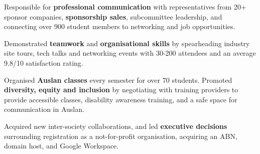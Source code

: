 \begin{zitemize}
\item Responsible for \textbf{professional communication} with representatives from 20+ sponsor companies, \textbf{sponsorship sales}, subcommittee {leadership}, and connecting over 900 student members to networking and job opportunities.
\item Demonstrated \textbf{teamwork} and \textbf{organisational skills} by spearheading industry site tours, tech talks and networking events with 30-200 attendees and an average 9.8/10 satisfaction rating. 
\end{zitemize}
\vspace{0.5em}

\begin{zitemize}
\item Organised \textbf{Auslan classes} every semester for over 70 students. Promoted \textbf{diversity, equity and inclusion} by negotiating with training providers to provide accessible classes, disability awareness training, and a safe space for communication in Auslan. 
\item Acquired new inter-society collaborations,  and led \textbf{executive decisions} surrounding registration as a not-for-profit organisation, acquiring an ABN, domain host, and Google Workspace.
\end{zitemize}
